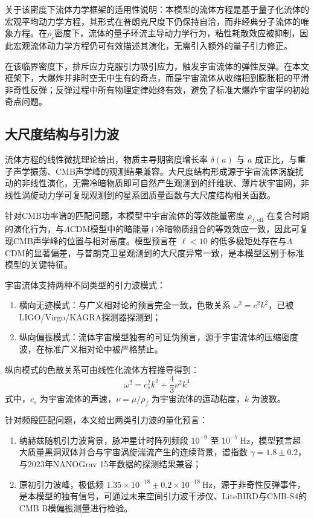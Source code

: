 \documentclass[aps,prd,preprint,superscriptaddress,floatfix]{revtex4-2}
\begin{document}
关于该密度下流体力学框架的适用性说明：本模型的流体方程是基于量子化流体的宏观平均动力学方程，其形式在普朗克尺度下仍保持自洽，而非经典分子流体的唯象方程。在$\rho_c$密度下，流体的量子环流主导动力学行为，粘性耗散效应被抑制，因此宏观流体动力学方程仍可有效描述其演化，无需引入额外的量子引力修正。

在该临界密度下，排斥应力克服引力吸引应力，触发宇宙流体的弹性反弹。在本文框架下，大爆炸并非时空无中生有的奇点，而是宇宙流体从收缩相到膨胀相的平滑非奇性反弹；反弹过程中所有物理定律始终有效，避免了标准大爆炸宇宙学的初始奇点问题。

\subsection{大尺度结构与引力波}
流体方程的线性微扰理论给出，物质主导期密度增长率 $\delta(a)$ 与 $a$ 成正比，与重子声学振荡、CMB声学峰的观测结果兼容。大尺度结构形成源于宇宙流体涡旋扰动的非线性演化，无需冷暗物质即可自然产生观测到的纤维状、薄片状宇宙网，非线性涡旋动力学可复现观测到的星系团质量函数与大尺度结构相关函数。

针对CMB功率谱的匹配问题，本模型中宇宙流体的等效能量密度 $\rho_{f, \mathrm{eff}}$ 在复合时期的演化行为，与$\Lambda$CDM模型中的暗能量+冷暗物质组合的等效效应一致，因此可复现CMB声学峰的位置与相对高度。模型预言在 $\ell<10$ 的低多极矩处存在与$\Lambda$CDM的显著偏差，与普朗克卫星观测到的大尺度异常一致，是本模型区别于标准模型的关键特征。

宇宙流体支持两种不同类型的引力波模式：
\begin{enumerate}
    \item 横向无迹模式：与广义相对论的预言完全一致，色散关系 $\omega^{2}=c^{2} k^{2}$，已被LIGO/Virgo/KAGRA探测器探测到；
    \item 纵向偏振模式：流体宇宙模型独有的可证伪预言，源于宇宙流体的压缩密度波，在标准广义相对论中被严格禁止。
\end{enumerate}

纵向模式的色散关系可由线性化流体方程推导得到：
\begin{equation}
\omega^{2}=c_{s}^{2} k^{2}+\frac{4}{3} \nu^{2} k^{4}
\label{eq:longitudinal_gw}
\end{equation}
式中，$c_{s}$ 为宇宙流体的声速，$\nu=\mu / \rho_{f}$ 为宇宙流体的运动粘度，$k$ 为波数。

针对频段匹配问题，本文给出两类引力波的量化预言：
\begin{enumerate}
    \item 纳赫兹随机引力波背景，脉冲星计时阵列频段 $10^{-9}$ 至 $10^{-7} \ \text{Hz}$，模型预言超大质量黑洞双体并合与宇宙涡旋湍流产生的连续背景，谱指数 $\gamma=1.8 \pm 0.2$，与2023年NANOGrav 15年数据的探测结果兼容\citep{nanograv202315yr}；
    \item 原初引力波峰，极低频 $1.35 \times 10^{-18} \pm 0.2 \times 10^{-18} \ \text{Hz}$，源于非奇性反弹事件，是本模型的独有信号，可通过未来空间引力波干涉仪、LiteBIRD与CMB-S4的CMB B模偏振测量进行检验。
\end{enumerate}
\end{document}
